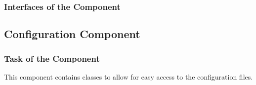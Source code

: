 \documentclass[11pt,a4paper]{article}
\begin{document}
\begin{center}
\end{center}

\subsubsection{Interfaces of the Component}

\subsection{Configuration Component}
\label{sec:conf-comp}

\subsubsection{Task of the Component}

This component contains classes to allow for easy access to the configuration
files.
\end{document}
